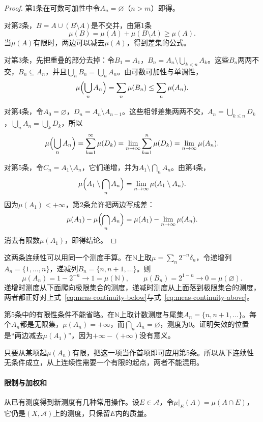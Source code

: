 \begin{proof}
第1条在可数可加性中令$A_n=\varnothing$（$n>m$）即得。

对第2条，$B=A\cup(B\setminus A)$是不交并，由第1条
\[
 \mu(B)=\mu(A)+\mu(B\setminus A)\geq\mu(A).
\]
当$\mu(A)$有限时，两边可以减去$\mu(A)$，得到差集的公式。

对第3条，先把重叠的部分去掉：令$B_1=A_1$，$B_n=A_n\setminus\bigcup_{k<n}A_k$。这些$B_n$两两不交，$B_n\subseteq A_n$，并且$\bigcup_nB_n=\bigcup_nA_n$。由可数可加性与单调性，
\[
 \mu\Bigl(\bigcup_nA_n\Bigr)=\sum_n\mu(B_n)\leq\sum_n\mu(A_n).
\]

对第4条，令$A_0=\varnothing$，$D_n=A_n\setminus A_{n-1}$。这些相邻差集两两不交，$A_n=\bigcup_{k\leq n}D_k$，$\bigcup_nA_n=\bigcup_kD_k$，所以
\[
 \mu\Bigl(\bigcup_nA_n\Bigr)=\sum_{k=1}^{\infty}\mu(D_k)
 =\lim_{n\to\infty}\sum_{k=1}^n\mu(D_k)=\lim_{n\to\infty}\mu(A_n).
\]

对第5条，令$C_n=A_1\setminus A_n$，它们递增，并为$A_1\setminus\bigcap_nA_n$。由第4条，
\[
 \mu\Bigl(A_1\setminus\bigcap_nA_n\Bigr)=\lim_{n\to\infty}\mu(A_1\setminus A_n).
\]
因为$\mu(A_1)<+\infty$，第2条允许把两边写成差：
\[
 \mu(A_1)-\mu\Bigl(\bigcap_nA_n\Bigr)=\mu(A_1)-\lim_{n\to\infty}\mu(A_n).
\]
消去有限数$\mu(A_1)$，即得结论。
\end{proof}

这两条连续性可以用同一个测度手算。在$\mathbb N$上取$\mu=\sum_n2^{-n}\delta_n$，令递增列$A_n=\{1,\dots,n\}$，递减列$B_n=\{n,n+1,\dots\}$。则
\[
 \mu(A_n)=1-2^{-n}\to1=\mu(\mathbb N),\qquad
 \mu(B_n)=2^{1-n}\to0=\mu(\varnothing).
\]
递增时测度从下面爬向极限集合的测度，递减时测度从上面落到极限集合的测度，两者都正好对上式~\eqref{eq:meas-continuity-below}与式~\eqref{eq:meas-continuity-above}。

第5条中的有限性条件不能省略。在$\mathbb N$上取计数测度与尾集$A_n=\{n,n+1,\dots\}$。每个$A_n$都是无限集，$\mu(A_n)=+\infty$，而$\bigcap_nA_n=\varnothing$，测度为$0$。证明失效的位置是“两边减去$\mu(A_1)$”，因为$+\infty-(+\infty)$没有意义。

只要从某项起$\mu(A_n)$有限，把这一项当作首项即可应用第5条。所以从下连续性无条件成立，从上连续性需要一个有限的起点，两者不能混用。

\paragraph{限制与加权和}
从已有测度得到新测度有几种常用操作。设$E\in\mathcal A$，令$\mu|_E(A)=\mu(A\cap E)$，它仍是$(X,\mathcal A)$上的测度，只保留$E$内的质量。

